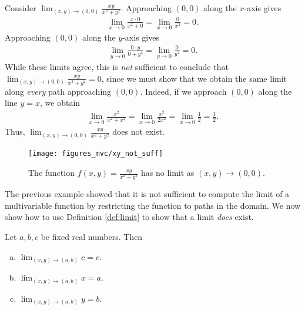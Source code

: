 \documentclass[12pt,letterpaper,reqno]{article}
\numberwithin{equation}{section}
\begin{document}
{\begin{example}
	Consider $\lim_{(x,y) \to (0,0)}\frac{xy}{x^2+y^2}$. Approaching $(0,0)$ along the $x$-axis gives
	\begin{align*}
		\lim_{x \to 0} \frac{x \cdot 0}{x^2+0}=\lim_{x \to 0} \frac{0}{x^2}=0.
	\end{align*}
	Approaching $(0,0)$ along the $y$-axis gives
	\begin{align*}
		\lim_{y \to 0} \frac{0 \cdot y}{0+y^2}=\lim_{y \to 0} \frac{0}{y^2}=0.
	\end{align*}
While these limits agree, this is \emph{not} sufficient to conclude that $\lim_{(x,y) \to (0,0)}\frac{xy}{x^2+y^2}=0$, since we must show that we obtain the same limit along \emph{every} path approaching $(0,0)$. Indeed, if we approach $(0,0)$ along the line $y=x$, we obtain
\begin{align*}
	\lim_{x \to 0}\frac{x^2}{x^2+x^2}=\lim_{x \to 0}\frac{x^2}{2x^2}=\lim_{x \to 0}\frac{1}{2}=\frac{1}{2}.
\end{align*}
Thus, $\lim_{(x,y) \to (0,0)}\frac{xy}{x^2+y^2}$ does not exist.
\end{example}

\begin{figure}[h]
	\begin{center}
		\texttt{[image: figures\_mvc/xy\_not\_suff]}
	\end{center}
	\caption{The function $f(x,y)=\frac{xy}{x^2+y^2}$ has no limit as $(x,y) \to (0,0)$.}
\end{figure}
\newpage 
The previous example showed that it is not sufficient to compute the limit of a multivariable function by restricting the function to paths in the domain. We now show how to use Definition \ref{def:limit} to show that a limit \emph{does} exist.

\begin{thm}\label{thm:simple_limits}
Let $a,b,c$ be fixed real numbers. Then
\begin{enumerate}[(a)]
	\item $\lim_{(x,y) \to (a,b)} c=c$.
	\item $\lim_{(x,y) \to (a,b)} x = a$.
	\item $\lim_{(x,y) \to (a,b)} y = b$.
\end{enumerate}	
\end{thm}

}
\end{document}
